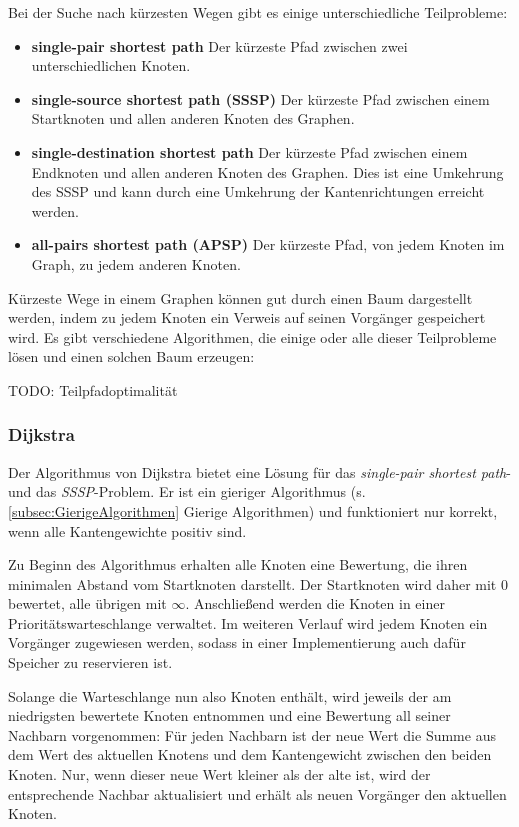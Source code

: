 Bei der Suche nach kürzesten Wegen gibt es einige unterschiedliche Teilprobleme:
\begin{itemize}
\item \textbf{single-pair shortest path}
Der kürzeste Pfad zwischen zwei unterschiedlichen Knoten.
\item \textbf{single-source shortest path (SSSP)}
Der kürzeste Pfad zwischen einem Startknoten und allen anderen Knoten des Graphen.
\item \textbf{single-destination shortest path}
Der kürzeste Pfad zwischen einem Endknoten und allen anderen Knoten des Graphen.
Dies ist eine Umkehrung des SSSP und kann durch eine Umkehrung der Kantenrichtungen erreicht werden.
\item \textbf{all-pairs shortest path (APSP)}
Der kürzeste Pfad, von jedem Knoten im Graph, zu jedem anderen Knoten.
\end{itemize}

Kürzeste Wege in einem Graphen können gut durch einen Baum dargestellt werden,
indem zu jedem Knoten ein Verweis auf seinen Vorgänger gespeichert wird.
Es gibt verschiedene Algorithmen, die einige oder alle dieser Teilprobleme lösen und einen solchen Baum erzeugen:

TODO: Teilpfadoptimalität

\subsubsection{Dijkstra}
\label{subsubsec:Dijkstra}

Der Algorithmus von Dijkstra bietet eine Lösung für das \textit{single-pair shortest path}- und das \textit{SSSP}-Problem.
Er ist ein gieriger Algorithmus (s. \ref{subsec:GierigeAlgorithmen} Gierige Algorithmen) und funktioniert nur korrekt, wenn alle Kantengewichte positiv sind.

Zu Beginn des Algorithmus erhalten alle Knoten eine Bewertung,
die ihren minimalen Abstand vom Startknoten darstellt.
Der Startknoten wird daher mit $0$ bewertet, alle übrigen mit $\infty$.
Anschließend werden die Knoten in einer Prioritätswarteschlange verwaltet.
Im weiteren Verlauf wird jedem Knoten ein Vorgänger zugewiesen werden,
sodass in einer Implementierung auch dafür Speicher zu reservieren ist.

Solange die Warteschlange nun also Knoten enthält,
wird jeweils der am niedrigsten bewertete Knoten entnommen und eine Bewertung all seiner Nachbarn vorgenommen:
Für jeden Nachbarn ist der neue Wert die Summe aus dem Wert des aktuellen Knotens und dem Kantengewicht zwischen den beiden Knoten.
Nur, wenn dieser neue Wert kleiner als der alte ist,
wird der entsprechende Nachbar aktualisiert und erhält als neuen Vorgänger den aktuellen Knoten.

